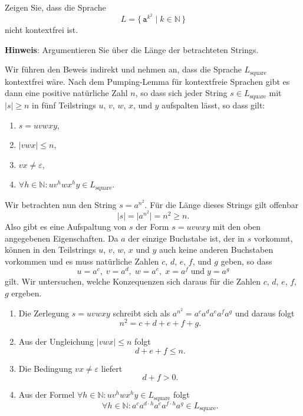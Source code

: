 \exercise
Zeigen Sie, dass die Sprache 
\[ L = \bigl\{ \,\mathtt{a}^{k^2} \;\big|\; k \in \mathbb{N}\, \bigr\} \]
nicht kontextfrei ist. 
\vspace*{0.2cm}

\noindent
\textbf{Hinweis}: Argumentieren Sie \"uber die L\"ange der betrachteten Strings. \eox
\vspace*{0.2cm}

\solution
Wir f\"uhren den Beweis indirekt und nehmen an, dass die Sprache $L_{\mathrm{square}}$ kontextfrei
w\"are.  Nach dem Pumping-Lemma f\"ur kontextfreie Sprachen gibt es dann eine positive
nat\"urliche Zahl $n$, so dass sich jeder String $s \in L_{\mathrm{square}}$ mit $|s| \geq n$ in f\"unf 
Teilstrings $u$, $v$, $w$, $x$, und $y$ aufspalten l\"asst, so dass gilt:
\begin{enumerate}
\item $s = uvwxy$,
\item $|vwx| \leq n$,
\item $vx \not= \varepsilon$,
\item $\forall h \in \mathbb{N}: uv^hwx^hy \in L_{\mathrm{square}}$. 
\end{enumerate} 
Wir betrachten nun den String $s = a^{n^2}$.  F\"ur die L\"ange dieses Strings gilt offenbar
\[ |s| = \big| a^{n^2} \big| = n^2 \geq n. \]
Also gibt es eine Aufspaltung von $s$ der Form $s = uvwxy$ mit den oben angegebenen Eigenschaften.
Da $a$ der einzige Buchstabe ist, der in $s$ vorkommt, k\"onnen in den Teilstrings $u$, $v$, $w$, $x$ und $y$
auch keine anderen Buchstaben vorkommen und es muss nat\"urliche Zahlen $c$, $d$, $e$, $f$, und $g$ geben, so
dass  
\[ u = a^c,\; v = a^d,\; w = a^e,\; x = a^f\; \mbox{und}\; y = a^g \]
gilt.  Wir untersuchen, welche Konzequenzen sich daraus f\"ur die Zahlen $c$, $d$, $e$, $f$, $g$ ergeben.
\begin{enumerate}
\item Die Zerlegung $s = uvwxy$ schreibt sich als $a^{n^2} = a^ca^da^ea^fa^g$ und daraus folgt
      \begin{equation}
        \label{eq:f1}
         n^2 = c + d + e + f + g.     
      \end{equation}
\item Aus der Ungleichung $|vwx| \leq n$ folgt  
      \begin{equation}
        \label{eq:f2}
        d + e + f \leq n.
      \end{equation}
\item Die Bedingung $vx \not= \varepsilon$ liefert
      \begin{equation}
        \label{eq:f3}
        d + f > 0.
      \end{equation}
\item Aus der Formel $\forall h \in \mathbb{N}: uv^hwx^hy \in L_{\mathrm{square}}$ folgt
      \begin{equation}
        \label{eq:f4}
        \forall h \in \mathbb{N}: a^ca^{d\cdot h}a^ea^{f\cdot h}a^g \in L_{\mathrm{square}}. 
      \end{equation}
\end{enumerate}
